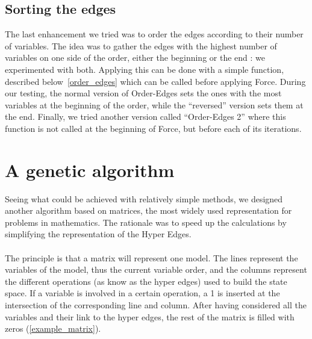 \documentclass[12pt]{report}
\begin{document}
\section{Sorting the edges} \label{sec:order_edges}

The last enhancement we tried was to order the edges according to their number of variables. The idea was to gather the edges with the highest number of variables on one side of the order, either the beginning or the end : we experimented with both. Applying this can be done with a simple function, described below~\ref{order_edges} which can be called before applying Force. During our testing, the normal version of Order-Edges sets the ones with the most variables at the beginning of the order, while the \enquote{reversed} version sets them at the end.
Finally, we tried another version called \enquote{Order-Edges 2} where this function is not called at the beginning of Force, but before each of its iterations.

\begin{algorithm}
\begin{algorithmic}[1]
  \label{order_edges}
\EndFunction
\end{algorithmic}
\end{algorithm}

\chapter{A genetic algorithm}

Seeing what could be achieved with relatively simple methods, we designed another algorithm based on matrices, the most widely used representation for problems in mathematics. The rationale was to speed up the calculations by simplifying the representation of the Hyper Edges.
\\\\
The principle is that a matrix will represent one model. The lines represent the variables of the model, thus the current variable order, and the columns represent the different operations (as know as the hyper edges) used to build the state space. If a variable is involved in a certain operation, a 1 is inserted at the intersection of the corresponding line and column. After having considered all the variables and their link to the hyper edges, the rest of the matrix is filled with zeros (\ref{example_matrix}).
\end{document}

